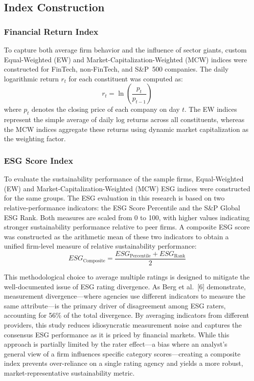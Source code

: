 \documentclass[12pt]{article}
\begin{document}
\subsection{Index Construction}

\subsubsection{Financial Return Index}
To capture both average firm behavior and the influence of sector giants, custom Equal-Weighted (EW) and Market-Capitalization-Weighted (MCW) indices were constructed for FinTech, non-FinTech, and S\&P~500 companies. The daily logarithmic return $r_t$ for each constituent was computed as:
\begin{equation}
r_t = \ln\!\left(\frac{p_t}{p_{t-1}}\right)
\end{equation}
where $p_t$ denotes the closing price of each company on day $t$. The EW indices represent the simple average of daily log returns across all constituents, whereas the MCW indices aggregate these returns using dynamic market capitalization as the weighting factor.

\subsubsection{ESG Score Index}
To evaluate the sustainability performance of the sample firms, Equal-Weighted (EW) and Market-Capitalization-Weighted (MCW) ESG indices were constructed for the same groups. The ESG evaluation in this research is based on two relative-performance indicators: the ESG Score Percentile and the S\&P Global ESG Rank. Both measures are scaled from 0 to 100, with higher values indicating stronger sustainability performance relative to peer firms. A composite ESG score was constructed as the arithmetic mean of these two indicators to obtain a unified firm-level measure of relative sustainability performance:
\begin{equation}
\textit{ESG}_{\text{Composite}} = \frac{\textit{ESG}_{\text{Percentile}} + \textit{ESG}_{\text{Rank}}}{2}
\end{equation}

This methodological choice to average multiple ratings is designed to mitigate the well-documented issue of ESG rating divergence. As Berg et al.~[6] demonstrate, measurement divergence---where agencies use different indicators to measure the same attribute---is the primary driver of disagreement among ESG raters, accounting for 56\% of the total divergence. By averaging indicators from different providers, this study reduces idiosyncratic measurement noise and captures the consensus ESG performance as it is priced by financial markets. While this approach is partially limited by the rater effect---a bias where an analyst's general view of a firm influences specific category scores---creating a composite index prevents over-reliance on a single rating agency and yields a more robust, market-representative sustainability metric.
\end{document}
